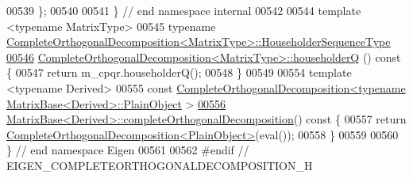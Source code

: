 \begin{DoxyCode}
00539 \};
00540 
00541 \} \textcolor{comment}{// end namespace internal}
00542 
00544 \textcolor{keyword}{template} <\textcolor{keyword}{typename} MatrixType>
00545 \textcolor{keyword}{typename} \hyperlink{group___householder___module_class_eigen_1_1_householder_sequence}{CompleteOrthogonalDecomposition<MatrixType>::HouseholderSequenceType}
\hyperlink{group___q_r___module_ac95b93ddad59c6e57d06fcd4737b27e1}{00546} \hyperlink{group___q_r___module_ac95b93ddad59c6e57d06fcd4737b27e1}{CompleteOrthogonalDecomposition<MatrixType>::householderQ}
      ()\textcolor{keyword}{ const }\{
00547   \textcolor{keywordflow}{return} m\_cpqr.householderQ();
00548 \}
00549 
00554 \textcolor{keyword}{template} <\textcolor{keyword}{typename} Derived>
00555 \textcolor{keyword}{const} \hyperlink{group___q_r___module_class_eigen_1_1_complete_orthogonal_decomposition}{CompleteOrthogonalDecomposition<typename MatrixBase<Derived>::PlainObject}
      >
\hyperlink{group___core___module_ae90b6846f05bd30b8d52b66e427e3e09}{00556} \hyperlink{group___core___module_ae90b6846f05bd30b8d52b66e427e3e09}{MatrixBase<Derived>::completeOrthogonalDecomposition}()\textcolor{keyword}{
       const }\{
00557   \textcolor{keywordflow}{return} \hyperlink{group___q_r___module_class_eigen_1_1_complete_orthogonal_decomposition}{CompleteOrthogonalDecomposition<PlainObject>}(eval());
00558 \}
00559 
00560 \}  \textcolor{comment}{// end namespace Eigen}
00561 
00562 \textcolor{preprocessor}{#endif  // EIGEN\_COMPLETEORTHOGONALDECOMPOSITION\_H}
\end{DoxyCode}

